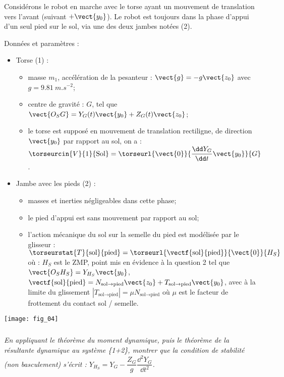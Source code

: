 \begin{multicols}{2}
Considérons le robot en marche avec le torse ayant un mouvement de
translation vers l’avant (suivant $+\vect{y_0}$). Le robot est toujours dans la
phase d'appui d'un seul pied sur le sol, via une des deux jambes notées
(2).

Données et paramètres :
\begin{itemize}
\item Torse (1) :
\begin{itemize}
\item masse $m_1$, accélération de la pesanteur : $\vect{g}=-g\vect{z_0}$ avec
$g=\SI{9,81}{m.s^{-2}}$;
\item centre de gravité : $G$, tel que $\vect{O_SG}=Y_G(t)\vect{y_0}+Z_G(t)\vect{z_0}$;
\item le torse est supposé en mouvement de translation rectiligne, de direction $\vect{y_0}$ par rapport au sol, on a : $\torseurcin{V}{1}{\text{Sol}}=\torseurl{\vect{0}}{\dfrac{\dd Y_G}{\dd t}\vect{y_0}}{G}$.
\end{itemize}
\item Jambe avec les pieds (2) :
\begin{itemize}
\item masses et inerties négligeables dans cette phase;
\item le pied d'appui est sans mouvement par rapport au sol;
\item l'action mécanique du sol sur la semelle du pied est modélisée par le glisseur : $\torseurstat{T}{\text{sol}}{\text{pied}}=\torseurl{\vectf{\text{sol}}{\text{pied}}}{\vect{0}}{H_S}$
où : $H_S$ est le ZMP, point mis en évidence à la question 2 tel que $\vect{O_S H_S}=Y_{H_S}\vect{y_0}$, 
 $\vectf{\text{sol}}{\text{pied}}=N_{\text{sol}\rightarrow \text{pied}}\vect{z_0}+T_{\text{sol}\rightarrow \text{pied}}\vect{y_0}$, avec à la limite du glissement $\left| T_{\text{sol}\rightarrow \text{pied}}\right| = \mu N_{\text{sol}\rightarrow \text{pied}}$ où $\mu$ est le facteur de frottement du contact sol / semelle.
\end{itemize}
\end{itemize}

\begin{center}
\texttt{[image: fig\_04]}
\end{center}
\fi

\subparagraph{} \textit{En appliquant le théorème du moment dynamique, puis le théorème de la résultante dynamique au
système \{1+2\}, montrer que la condition de stabilité (non basculement) s'écrit : $Y_{H_S}=Y_G-\dfrac{Z_G}{g}\dfrac{\dd^2 Y_G}{\dd t^2}$.}
\ifprof
\begin{corrige} ~\\


\end{corrige}
\end{multicols}
